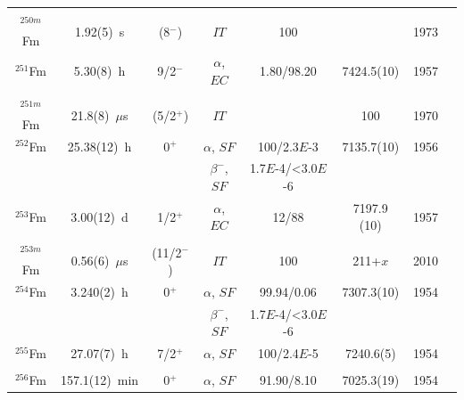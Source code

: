 \begin{center}
\begin{longtable}{c|ccccccl}
			& 				&  			&					&			& 				    &		&{\tiny\cite{Mistry2018,Rezynkina2018,Tezekbayeva2021,Bronis2022,Warbinek2024}}\\
$^{250m}$Fm	& 1.92(5)~s		&  (8$^-$)	&$IT$				&100		& 			        &1973	&{\tiny\cite{Ghiorso1973,Lazarev1989}}\\
$^{251}$Fm	& 5.30(8)~h		&  9/2$^-$	&$\alpha$, $EC$		&1.80/98.20	& 7424.5(10)		&1957	&{\tiny\cite{Amiel1957,Eskola1970a,Ahmad1973,Ahmad1978,Chasteler1987,Popeko2006}}\\
			& 				&  			&					&			& 				    &		&{\tiny\cite{Hessberger2006,Asai2011,Rezynkina2018,Ito2018,Devaraja2019}}\\
$^{251m}$Fm	& 21.8(8)~$\mu$s&  (5/2$^+$)& $IT$		        &          	& 100               &1970	&{\tiny\cite{Eskola1970a,Dittner1971a,Popeko2006,Hessberger2006,Asai2011,Rezynkina2018}}\\
$^{252}$Fm	& 25.38(12)~h	&  0$^+$	&$\alpha$, $SF$		&100/2.3$E$-3& 7135.7(10)		&1956	&{\tiny\cite{Friedmann1956,Donets1966,Chwaszczewska1967,Ahmad1984,Chasteler1987,Sagaidak1998}}\\
			&				& 			&$\beta^-$, $SF$	&1.7$E$-4/<3.0$E$-6& 			&		&{\tiny\cite{Kratz2013,Asai2016,Devaraja2019}}\\
$^{253}$Fm	& 3.00(12)~d	&  1/2$^+$	&$\alpha$, $EC$		&12/88		& 7197.9 (10)		&1957	&{\tiny\cite{Amiel1957a,Sikkeland1959,Ahmad1967,Chasteler1987,Asai2005,Streicher2010}}\\ 
			& 				&  			&					&			& 				    &		&{\tiny\cite{Streicher2010,Antalic2011,Kratz2013,Devaraja2019}}\\
$^{253m}$Fm	& 0.56(6)~$\mu$s&  (11/2$^-$)&$IT$		        &100		& 211+$x$		    &2010	&{\tiny\cite{Streicher2010,Antalic2011}}\\ 
$^{254}$Fm	& 3.240(2)~h	&  0$^+$	&$\alpha$, $SF$		&99.94/0.06	& 7307.3(10)		&1954	&{\tiny\cite{Harvey1954,Choppin1954,Jones1956,Fields1967,Chasteler1987,Sagaidak1998}}\\
			&				& 			&$\beta^-$, $SF$	&1.7$E$-4/<3.0$E$-6& 			&		&{\tiny\cite{Kratz2013,Devaraja2019,Warbinek2024}}\\
$^{255}$Fm	& 27.07(7)~h	&  7/2$^+$	&$\alpha$, $SF$		&100/2.4$E$-5& 7240.6(5)		&1954	&{\tiny\cite{Choppin1954,Jones1956,Phillips1963,Asaro1964,Ahmad2000,Holden2000}}\\ 
			& 				&  			&					&			& 				    &		&{\tiny\cite{Backe2005,Kondev2009,Kratz2013,Asai2013,Devaraja2019}}\\
$^{256}$Fm	& 157.1(12)~min	&  0$^+$	&$\alpha$, $SF$		&91.90/8.10	& 7025.3(19)		&1954	&{\tiny\cite{Choppin1955,Phillips1958,Sikkeland1965,Hoff1968,Flynn1972,Lougheed1981}}\\

\end{longtable}
\end{center}
